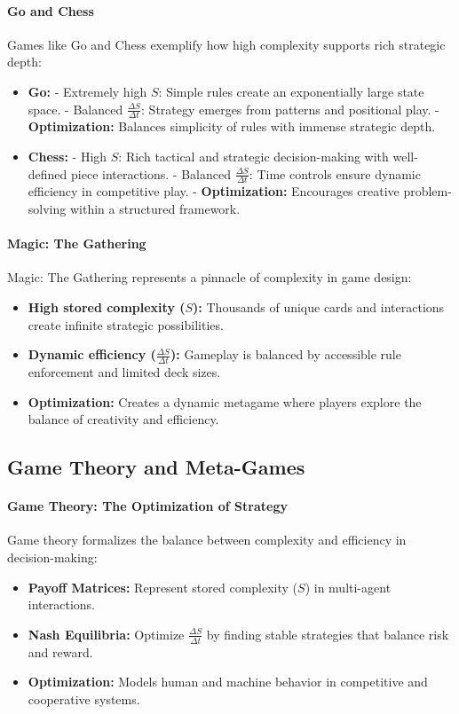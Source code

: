 \documentclass[12pt]{article}
\begin{document}
\paragraph{Go and Chess}
Games like Go and Chess exemplify how high complexity supports rich strategic depth:
\begin{itemize}
    \item \textbf{Go:}
        - Extremely high \(S\): Simple rules create an exponentially large state space.
        - Balanced \(\frac{\Delta S}{\Delta t}\): Strategy emerges from patterns and positional play.
        - \textbf{Optimization:} Balances simplicity of rules with immense strategic depth.
    \item \textbf{Chess:} 
        - High \(S\): Rich tactical and strategic decision-making with well-defined piece interactions.
        - Balanced \(\frac{\Delta S}{\Delta t}\): Time controls ensure dynamic efficiency in competitive play.
        - \textbf{Optimization:} Encourages creative problem-solving within a structured framework.
\end{itemize}

\paragraph{Magic: The Gathering}
Magic: The Gathering represents a pinnacle of complexity in game design:
\begin{itemize}
    \item \textbf{High stored complexity (\(S\)):} Thousands of unique cards and interactions create infinite strategic possibilities.
    \item \textbf{Dynamic efficiency (\(\frac{\Delta S}{\Delta t}\)):} Gameplay is balanced by accessible rule enforcement and limited deck sizes.
    \item \textbf{Optimization:} Creates a dynamic metagame where players explore the balance of creativity and efficiency.
\end{itemize}

\subsection{Game Theory and Meta-Games}

\paragraph{Game Theory: The Optimization of Strategy}
Game theory formalizes the balance between complexity and efficiency in decision-making:
\begin{itemize}
    \item \textbf{Payoff Matrices:} Represent stored complexity (\(S\)) in multi-agent interactions.
    \item \textbf{Nash Equilibria:} Optimize \(\frac{\Delta S}{\Delta t}\) by finding stable strategies that balance risk and reward.
    \item \textbf{Optimization:} Models human and machine behavior in competitive and cooperative systems.
\end{itemize}
\end{document}

